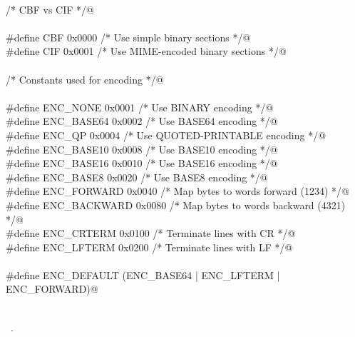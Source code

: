 \documentclass[10pt,a4paper,twoside,notitlepage]{article}
\begin{document}
\begin{flushleft}
\begin{list}{}{}
\mbox{}\verb@@\\
\mbox{}\verb@  /* CBF vs CIF */@\\
\mbox{}\verb@@\\
\mbox{}\verb@#define CBF             0x0000  /* Use simple binary sections         */@\\
\mbox{}\verb@#define CIF             0x0001  /* Use MIME-encoded binary sections   */@\\
\mbox{}\verb@@\\
\mbox{}\verb@  /* Constants used for encoding */@\\
\mbox{}\verb@@\\
\mbox{}\verb@#define ENC_NONE        0x0001  /* Use BINARY encoding                 */@\\
\mbox{}\verb@#define ENC_BASE64      0x0002  /* Use BASE64 encoding                 */@\\
\mbox{}\verb@#define ENC_QP          0x0004  /* Use QUOTED-PRINTABLE encoding       */@\\
\mbox{}\verb@#define ENC_BASE10      0x0008  /* Use BASE10 encoding                 */@\\
\mbox{}\verb@#define ENC_BASE16      0x0010  /* Use BASE16 encoding                 */@\\
\mbox{}\verb@#define ENC_BASE8       0x0020  /* Use BASE8  encoding                 */@\\
\mbox{}\verb@#define ENC_FORWARD     0x0040  /* Map bytes to words forward (1234)   */@\\
\mbox{}\verb@#define ENC_BACKWARD    0x0080  /* Map bytes to words backward (4321)  */@\\
\mbox{}\verb@#define ENC_CRTERM      0x0100  /* Terminate lines with CR             */@\\
\mbox{}\verb@#define ENC_LFTERM      0x0200  /* Terminate lines with LF             */@\\
\mbox{}\verb@@\\
\mbox{}\verb@#define ENC_DEFAULT (ENC_BASE64 | ENC_LFTERM | ENC_FORWARD)@\\
\mbox{}\verb@@\\
\mbox{}\verb@@{\NWsep}
\end{list}
\vspace{-1ex}
\footnotesize\addtolength{\baselineskip}{-1ex}
\begin{list}{}{\setlength{\itemsep}{-\parsep}\setlength{\itemindent}{-\leftmargin}}
\item \NWtxtMacroRefIn\ .
\end{list}
\end{flushleft}
\end{document}
